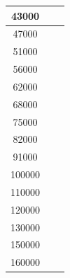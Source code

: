 \documentclass{llncs}
\begin{document}
\begin{longtable}{|c|c|c|}
			43000                    &                                                   &                                                      \\ \hline
			47000                    &                                                   &                                                      \\ \hline
			51000                    &                                                   &                                                      \\ \hline
			56000                    &                                                   &                                                      \\ \hline
			62000                    &                                                   &                                                      \\ \hline
			68000                    &                                                   &                                                      \\ \hline
			75000                    &                                                   &                                                      \\ \hline
			82000                    &                                                   &                                                      \\ \hline
			91000                    &                                                   &                                                      \\ \hline
			100000                   &                                                   &                                                      \\ \hline
			110000                   &                                                   &                                                      \\ \hline
			120000                   &                                                   &                                                      \\ \hline
			130000                   &                                                   &                                                      \\ \hline
			150000                   &                                                   &                                                      \\ \hline
			160000                   &                                                   &                                                      \\ \hline

\end{longtable}
\end{document}
